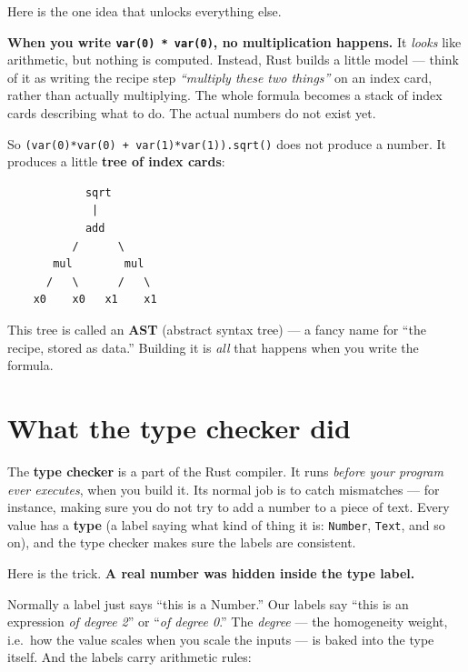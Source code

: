 \documentclass[11pt]{article}
\newcommand{\code}[1]{\texttt{#1}}
\begin{document}
Here is the one idea that unlocks everything else.

\begin{keyidea}
\textbf{When you write \code{var(0) * var(0)}, no multiplication happens.} It
\emph{looks} like arithmetic, but nothing is computed. Instead, Rust builds a
little model --- think of it as writing the recipe step \emph{``multiply these
two things''} on an index card, rather than actually multiplying. The whole
formula becomes a stack of index cards describing what to do. The actual numbers
do not exist yet.
\end{keyidea}

So \code{(var(0)*var(0) + var(1)*var(1)).sqrt()} does not produce a number. It
produces a little \textbf{tree of index cards}:

\begin{center}
\begin{BVerbatim}
            sqrt
             |
            add
          /      \
       mul        mul
      /   \      /   \
    x0    x0   x1    x1
\end{BVerbatim}
\end{center}

This tree is called an \textbf{AST} (abstract syntax tree) --- a fancy name for
``the recipe, stored as data.'' Building it is \emph{all} that happens when you
write the formula.

\section{What the type checker did}

The \textbf{type checker} is a part of the Rust compiler. It runs \emph{before
your program ever executes}, when you build it. Its normal job is to catch
mismatches --- for instance, making sure you do not try to add a number to a
piece of text. Every value has a \textbf{type} (a label saying what kind of
thing it is: \code{Number}, \code{Text}, and so on), and the type checker makes
sure the labels are consistent.

Here is the trick. \textbf{A real number was hidden inside the type label.}

Normally a label just says ``this is a Number.'' Our labels say ``this is an
expression \emph{of degree 2}'' or ``\emph{of degree 0}.'' The \emph{degree} ---
the homogeneity weight, i.e.\ how the value scales when you scale the inputs ---
is baked into the type itself. And the labels carry arithmetic rules:
\end{document}
